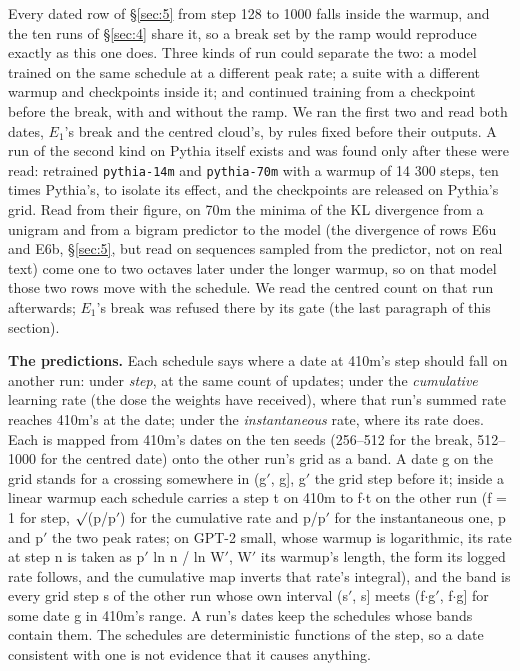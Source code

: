 \documentclass[11pt]{article}
\begin{document}
Every dated row of \S\ref{sec:5} from step 128 to 1000 falls inside the warmup, and the ten runs of \S\ref{sec:4} share it, so a break set by the ramp would reproduce exactly as this one does. Three kinds of run could separate the two: a model trained on the same schedule at a different peak rate; a suite with a different warmup and checkpoints inside it; and continued training from a checkpoint before the break, with and without the ramp. We ran the first two and read both dates, $E_{1}$'s break and the centred cloud's, by rules fixed before their outputs. A run of the second kind on Pythia itself exists and was found only after these were read: \citet{belrose2024} retrained \texttt{pythia-14m} and \texttt{pythia-70m} with a warmup of 14 300 steps, ten times Pythia's, to isolate its effect, and the checkpoints are released on Pythia's grid. Read from their figure, on 70m the minima of the KL divergence from a unigram and from a bigram predictor to the model (the divergence of rows E6u and E6b, \S\ref{sec:5}, but read on sequences sampled from the predictor, not on real text) come one to two octaves later under the longer warmup, so on that model those two rows move with the schedule. We read the centred count on that run afterwards; $E_{1}$'s break was refused there by its gate (the last paragraph of this section).

\textbf{The predictions.} Each schedule says where a date at 410m's step should fall on another run: under \emph{step}, at the same count of updates; under the \emph{cumulative} learning rate (the dose the weights have received), where that run's summed rate reaches 410m's at the date; under the \emph{instantaneous} rate, where its rate does. Each is mapped from 410m's dates on the ten seeds (256--512 for the break, 512--1000 for the centred date) onto the other run's grid as a band. A date g on the grid stands for a crossing somewhere in (g$'$, g], g$'$ the grid step before it; inside a linear warmup each schedule carries a step t on 410m to f$\cdot $t on the other run (f = 1 for step, $\surd $(p/p$'$) for the cumulative rate and p/p$'$ for the instantaneous one, p and p$'$ the two peak rates; on GPT-2 small, whose warmup is logarithmic, its rate at step n is taken as p$'$ ln n / ln W$'$, W$'$ its warmup's length, the form its logged rate follows, and the cumulative map inverts that rate's integral), and the band is every grid step s of the other run whose own interval (s$'$, s] meets (f$\cdot $g$'$, f$\cdot $g] for some date g in 410m's range. A run's dates keep the schedules whose bands contain them. The schedules are deterministic functions of the step, so a date consistent with one is not evidence that it causes anything.
\end{document}
